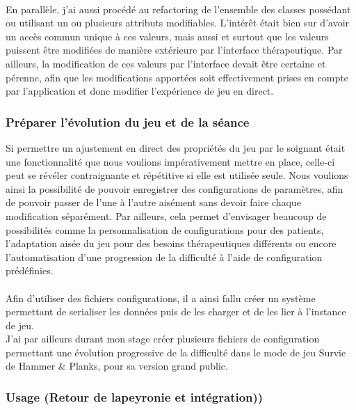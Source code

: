 \paragraph{}
En parallèle, j'ai aussi procédé au refactoring de l'ensemble des classes possédant ou utilisant un ou plusieurs attributs modifiables. L'intérêt était bien sur d'avoir un accès commun unique à ces valeurs, mais aussi et surtout que les valeurs puissent être modifiées de manière extérieure par l'interface thérapeutique. Par ailleurs, la modification de ces valeurs par l'interface devait être certaine et pérenne, afin que les modifications apportées soit effectivement prises en compte par l'application et donc modifier l'expérience de jeu en direct.

	\subsubsection*{Préparer l'évolution du jeu et de la séance}
Si permettre un ajustement en direct des propriétés du jeu par le soignant était une fonctionnalité que nous voulions impérativement mettre en place, celle-ci peut se révéler contraignante et répétitive si elle est utilisée seule. Nous voulions ainsi la possibilité de pouvoir enregistrer des configurations de paramètres, afin de pouvoir passer de l'une à l'autre aisément sans devoir faire chaque modification séparément. Par ailleurs, cela permet d'envisager beaucoup de possibilités comme la personnalisation de configurations pour des patients, l'adaptation aisée du jeu pour des besoins thérapeutiques différents ou encore l'automatisation d'une progression de la difficulté à l'aide de configuration prédéfinies.

\paragraph{}Afin d'utiliser des fichiers configurations, il a ainsi fallu créer un système permettant de serialiser les données puis de les charger et de les lier à l'instance de jeu.\\
J'ai par ailleurs durant mon stage créer plusieurs fichiers de configuration permettant une évolution progressive de la difficulté dans le mode de jeu Survie de Hammer \& Planks, pour sa version grand public.

	\subsubsection{Usage (Retour de lapeyronie et intégration))}
	

